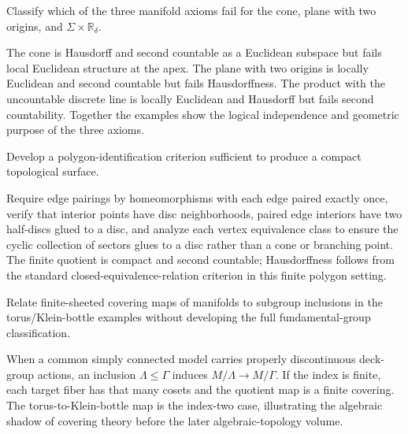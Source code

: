 \begin{problem}[Challenge]\label{chal:vii01-02}
Classify which of the three manifold axioms fail for the cone, plane with two origins, and \(\Sigma\times\mathbb R_\delta\).
\end{problem}
\begin{solution}
The cone is Hausdorff and second countable as a Euclidean subspace but fails local Euclidean structure at the apex.  The plane with two origins is locally Euclidean and second countable but fails Hausdorffness.  The product with the uncountable discrete line is locally Euclidean and Hausdorff but fails second countability.  Together the examples show the logical independence and geometric purpose of the three axioms.
\end{solution}

\begin{problem}[Challenge]\label{chal:vii01-03}
Develop a polygon-identification criterion sufficient to produce a compact topological surface.
\end{problem}
\begin{solution}
Require edge pairings by homeomorphisms with each edge paired exactly once, verify that interior points have disc neighborhoods, paired edge interiors have two half-discs glued to a disc, and analyze each vertex equivalence class to ensure the cyclic collection of sectors glues to a disc rather than a cone or branching point.  The finite quotient is compact and second countable; Hausdorffness follows from the standard closed-equivalence-relation criterion in this finite polygon setting.
\end{solution}

\begin{problem}[Challenge]\label{chal:vii01-04}
Relate finite-sheeted covering maps of manifolds to subgroup inclusions in the torus/Klein-bottle examples without developing the full fundamental-group classification.
\end{problem}
\begin{solution}
When a common simply connected model carries properly discontinuous deck-group actions, an inclusion \(\Lambda\le\Gamma\) induces \(M/\Lambda\to M/\Gamma\).  If the index is finite, each target fiber has that many cosets and the quotient map is a finite covering.  The torus-to-Klein-bottle map is the index-two case, illustrating the algebraic shadow of covering theory before the later algebraic-topology volume.
\end{solution}

